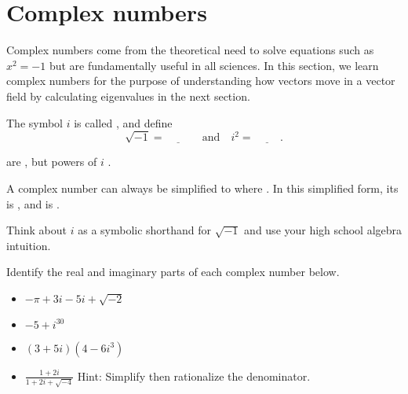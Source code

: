 \documentclass[../main.tex]{subfiles}
\begin{document}
 \section{Complex numbers}

Complex numbers come from the theoretical need to solve equations such as \(x^{2} = -1\) but are fundamentally useful in all sciences.  In this section, we learn complex numbers for the purpose of understanding how vectors move in a vector field by calculating eigenvalues in the next section.

\begin{definition}
  The symbol \(i\) is called , and define
  \[
    \sqrt{-1} = \underline{\hspace{1cm}}
    \quad\text{and}\quad 
    i^{2} = \underline{\hspace{1cm}}.
  \]

   are , but powers of \(i\) .

  A complex number can always be simplified to \underline{\hspace{2cm}} where \underline{\hspace{1.5in}}. In this simplified form, its  is \underline{\hspace{1cm}}, and  is \underline{\hspace{1cm}}.
\end{definition}
\faStar{} Think about \(i\) as a symbolic shorthand for \(\sqrt{-1}\) and use your high school algebra intuition.


\begin{example}
  Identify the real and imaginary parts of each complex number below. 

  \begin{itemize}[wide]
    \item \(-\pi + 3i - 5i + \sqrt{-2}\)

    \item \(-5 + i^{30} \)

    \item \((3 + 5i) (4 - 6i^{3})\)

    \item \(\frac{1 + 2i}{1 + 2i + \sqrt{-4}}\) \quad Hint: Simplify then rationalize the denominator.
  \end{itemize}
\end{example}
\clearpage
\end{document}
